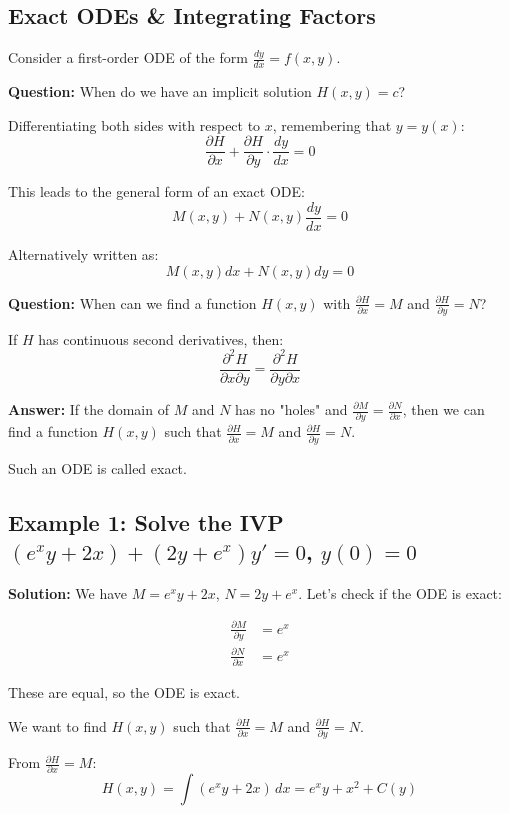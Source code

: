 \documentclass{article}
\begin{document}
\subsection*{Exact ODEs \& Integrating Factors}

Consider a first-order ODE of the form $\frac{dy}{dx} = f(x,y)$.

\textbf{Question:} When do we have an implicit solution $H(x,y) = c$?

Differentiating both sides with respect to $x$, remembering that $y = y(x)$:
\[
\frac{\partial H}{\partial x} + \frac{\partial H}{\partial y} \cdot \frac{dy}{dx} = 0
\]

This leads to the general form of an exact ODE:
\[
M(x,y) + N(x,y)\frac{dy}{dx} = 0
\]

Alternatively written as:
\[
M(x,y)dx + N(x,y)dy = 0
\]

\textbf{Question:} When can we find a function $H(x,y)$ with $\frac{\partial H}{\partial x} = M$ and $\frac{\partial H}{\partial y} = N$?

If $H$ has continuous second derivatives, then:
\[
\frac{\partial^2 H}{\partial x \partial y} = \frac{\partial^2 H}{\partial y \partial x}
\]

\textbf{Answer:} If the domain of $M$ and $N$ has no "holes" and $\frac{\partial M}{\partial y} = \frac{\partial N}{\partial x}$, then we can find a function $H(x,y)$ such that $\frac{\partial H}{\partial x} = M$ and $\frac{\partial H}{\partial y} = N$.

Such an ODE is called exact.

\subsection*{Example 1: Solve the IVP $(e^x y + 2x) + (2y + e^x)y' = 0$, $y(0) = 0$}

\textbf{Solution:} We have $M = e^x y + 2x$, $N = 2y + e^x$. Let's check if the ODE is exact:

\begin{align*}
    \frac{\partial M}{\partial y} &= e^x \\
    \frac{\partial N}{\partial x} &= e^x
\end{align*}

These are equal, so the ODE is exact.

We want to find $H(x,y)$ such that $\frac{\partial H}{\partial x} = M$ and $\frac{\partial H}{\partial y} = N$.

From $\frac{\partial H}{\partial x} = M$:
\[
    H(x,y) = \int (e^x y + 2x) \, dx = e^x y + x^2 + C(y)
\]
\end{document}

